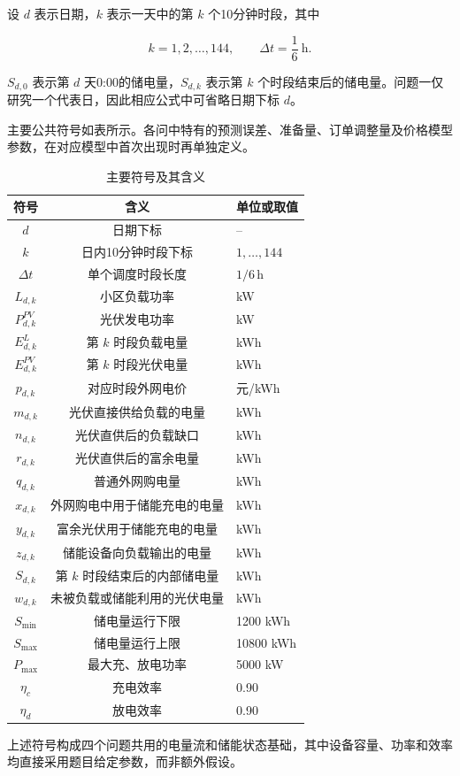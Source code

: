 设 $d$ 表示日期，$k$ 表示一天中的第 $k$ 个10分钟时段，其中

\begin{equation}
k=1,2,\ldots,144,
\qquad
\Delta t=\frac{1}{6}\ \mathrm{h}.
\end{equation}

$S_{d,0}$ 表示第 $d$ 天0:00的储电量，$S_{d,k}$ 表示第 $k$ 个时段结束后的储电量。问题一仅研究一个代表日，因此相应公式中可省略日期下标 $d$。

主要公共符号如表所示。各问中特有的预测误差、准备量、订单调整量及价格模型参数，在对应模型中首次出现时再单独定义。

\begin{table}[H]
    \centering
    \caption{主要符号及其含义}
    \begin{tabular}{ccl}
        \hline
        符号 & 含义 & 单位或取值 \\
        \hline
        $d$ & 日期下标 & -- \\
        $k$ & 日内10分钟时段下标 & $1,\ldots,144$ \\
        $\Delta t$ & 单个调度时段长度 & $1/6\,\mathrm{h}$ \\
        $L_{d,k}$ & 小区负载功率 & kW \\
        $P^{PV}_{d,k}$ & 光伏发电功率 & kW \\
        $E^L_{d,k}$ & 第 $k$ 时段负载电量 & kWh \\
        $E^{PV}_{d,k}$ & 第 $k$ 时段光伏电量 & kWh \\
        $p_{d,k}$ & 对应时段外网电价 & 元/kWh \\
        $m_{d,k}$ & 光伏直接供给负载的电量 & kWh \\
        $n_{d,k}$ & 光伏直供后的负载缺口 & kWh \\
        $r_{d,k}$ & 光伏直供后的富余电量 & kWh \\
        $q_{d,k}$ & 普通外网购电量 & kWh \\
        $x_{d,k}$ & 外网购电中用于储能充电的电量 & kWh \\
        $y_{d,k}$ & 富余光伏用于储能充电的电量 & kWh \\
        $z_{d,k}$ & 储能设备向负载输出的电量 & kWh \\
        $S_{d,k}$ & 第 $k$ 时段结束后的内部储电量 & kWh \\
        $w_{d,k}$ & 未被负载或储能利用的光伏电量 & kWh \\
        $S_{\min}$ & 储电量运行下限 & 1200 kWh \\
        $S_{\max}$ & 储电量运行上限 & 10800 kWh \\
        $P_{\max}$ & 最大充、放电功率 & 5000 kW \\
        $\eta_c$ & 充电效率 & 0.90 \\
        $\eta_d$ & 放电效率 & 0.90 \\
        \hline
    \end{tabular}
\end{table}

上述符号构成四个问题共用的电量流和储能状态基础，其中设备容量、功率和效率均直接采用题目给定参数，而非额外假设。